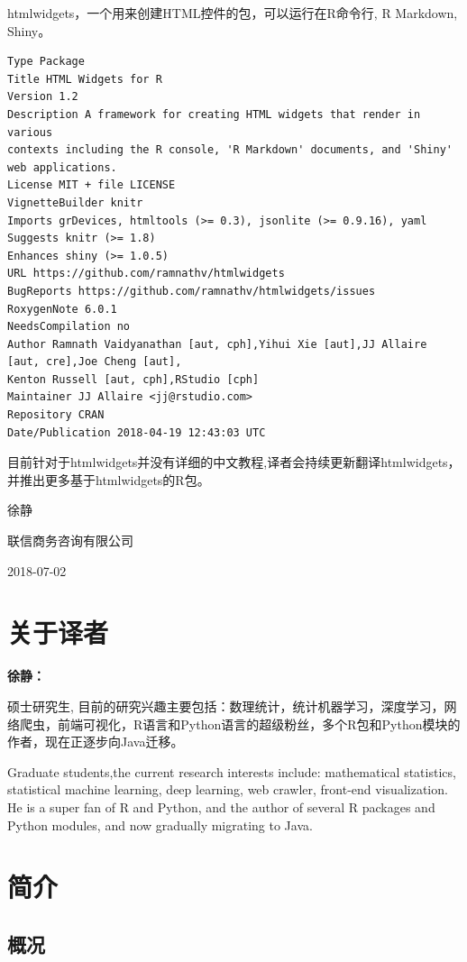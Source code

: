 \documentclass[]{book}
\theoremstyle{definition}
\theoremstyle{definition}
\theoremstyle{definition}
\theoremstyle{remark}
\begin{document}
htmlwidgets，一个用来创建HTML控件的包，可以运行在R命令行, R Markdown,
Shiny。

\begin{verbatim}
Type Package
Title HTML Widgets for R
Version 1.2
Description A framework for creating HTML widgets that render in various
contexts including the R console, 'R Markdown' documents, and 'Shiny'
web applications.
License MIT + file LICENSE
VignetteBuilder knitr
Imports grDevices, htmltools (>= 0.3), jsonlite (>= 0.9.16), yaml
Suggests knitr (>= 1.8)
Enhances shiny (>= 1.0.5)
URL https://github.com/ramnathv/htmlwidgets
BugReports https://github.com/ramnathv/htmlwidgets/issues
RoxygenNote 6.0.1
NeedsCompilation no
Author Ramnath Vaidyanathan [aut, cph],Yihui Xie [aut],JJ Allaire [aut, cre],Joe Cheng [aut],
Kenton Russell [aut, cph],RStudio [cph]
Maintainer JJ Allaire <jj@rstudio.com>
Repository CRAN
Date/Publication 2018-04-19 12:43:03 UTC
\end{verbatim}

目前针对于htmlwidgets并没有详细的中文教程,译者会持续更新翻译htmlwidgets，并推出更多基于htmlwidgets的R包。

徐静

联信商务咨询有限公司

2018-07-02

\chapter*{关于译者}

\textbf{徐静：}

硕士研究生,
目前的研究兴趣主要包括：数理统计，统计机器学习，深度学习，网络爬虫，前端可视化，R语言和Python语言的超级粉丝，多个R包和Python模块的作者，现在正逐步向Java迁移。

Graduate students,the current research interests include: mathematical
statistics, statistical machine learning, deep learning, web crawler,
front-end visualization. He is a super fan of R and Python, and the
author of several R packages and Python modules, and now gradually
migrating to Java.

\chapter{简介}\label{htmlwidgets-intro}

\section{概况}
\end{document}

